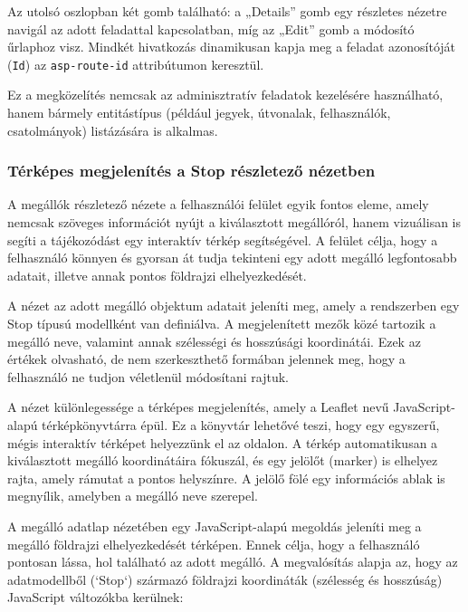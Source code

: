 Az utolsó oszlopban két gomb található: a „Details” gomb egy részletes nézetre navigál az adott feladattal kapcsolatban, míg az „Edit” gomb a módosító űrlaphoz visz. Mindkét hivatkozás dinamikusan kapja meg a feladat azonosítóját (\texttt{Id}) az \texttt{asp-route-id} attribútumon keresztül.

Ez a megközelítés nemcsak az adminisztratív feladatok kezelésére használható, hanem bármely entitástípus (például jegyek, útvonalak, felhasználók, csatolmányok) listázására is alkalmas. 


\subsubsection{Térképes megjelenítés a Stop részletező nézetben}
A megállók részletező nézete a felhasználói felület egyik fontos eleme, amely nemcsak szöveges információt nyújt a kiválasztott megállóról, hanem vizuálisan is segíti a tájékozódást egy interaktív térkép segítségével. A felület célja, hogy a felhasználó könnyen és gyorsan át tudja tekinteni egy adott megálló legfontosabb adatait, illetve annak pontos földrajzi elhelyezkedését.

A nézet az adott megálló objektum adatait jeleníti meg, amely a rendszerben egy Stop típusú modellként van definiálva. A megjelenített mezők közé tartozik a megálló neve, valamint annak szélességi és hosszúsági koordinátái. Ezek az értékek olvasható, de nem szerkeszthető formában jelennek meg, hogy a felhasználó ne tudjon véletlenül módosítani rajtuk.

A nézet különlegessége a térképes megjelenítés, amely a Leaflet nevű JavaScript-alapú térképkönyvtárra épül. Ez a könyvtár lehetővé teszi, hogy egy egyszerű, mégis interaktív térképet helyezzünk el az oldalon. A térkép automatikusan a kiválasztott megálló koordinátáira fókuszál, és egy jelölőt (marker) is elhelyez rajta, amely rámutat a pontos helyszínre. A jelölő fölé egy információs ablak is megnyílik, amelyben a megálló neve szerepel.

A megálló adatlap nézetében egy JavaScript-alapú megoldás jeleníti meg a megálló földrajzi elhelyezkedését térképen. Ennek célja, hogy a felhasználó pontosan lássa, hol található az adott megálló. A megvalósítás alapja az, hogy az adatmodellből (`Stop`) származó földrajzi koordináták (szélesség és hosszúság) JavaScript változókba kerülnek:


